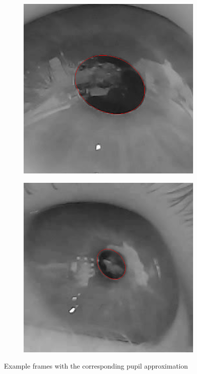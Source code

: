 \begin{figure}[h]
\begin{subfigure}{0.4\textwidth}
    \end{subfigure}
    \begin{subfigure}{0.4\textwidth}
        \centering
        \includegraphics[width=0.9\linewidth]{plots/acwe/robustfitfit.png} 
    \end{subfigure}
    \begin{subfigure}{0.4\textwidth}
        \centering
        \includegraphics[width=0.9\linewidth]{plots/acwe/robustfitfit2.png} 
    \end{subfigure}
\caption{Example frames with the corresponding pupil approximation}
\label{fig:robust_fit_acwe_ransac}
\end{figure}


